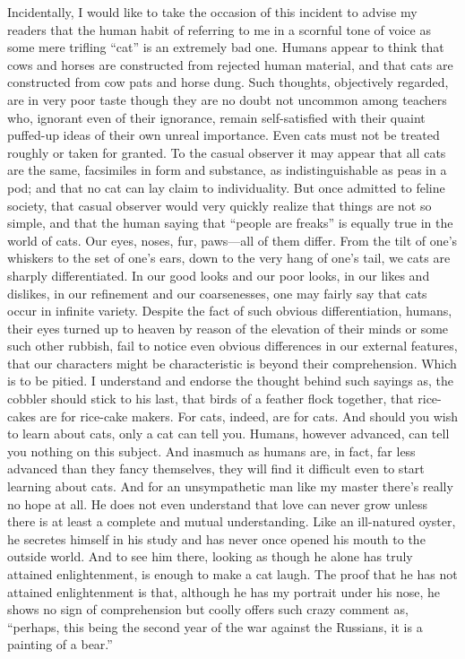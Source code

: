 \documentclass{book}
\begin{document}
Incidentally, I would like to take the occasion of this incident to
advise my readers that the human habit of referring to me in a scornful
tone of voice as some mere trifling ``cat'' is an extremely bad one.
Humans appear to think that cows and horses are constructed from
rejected human material, and that cats are constructed from cow pats and
horse dung. Such thoughts, objectively regarded, are in very poor taste
though they are no doubt not uncommon among teachers who, ignorant even
of their ignorance, remain self-satisfied with their quaint puffed-up
ideas of their own unreal importance. Even cats must not be treated
roughly or taken for granted. To the casual observer it may appear that
all cats are the same, facsimiles in form and substance, as
indistinguishable as peas in a pod; and that no cat can lay claim to
individuality. But once admitted to feline society, that casual observer
would very quickly realize that things are not so simple, and that the
human saying that ``people are freaks'' is equally true in the world of
cats. Our eyes, noses, fur, paws---all of them differ. From the tilt of
one's whiskers to the set of one's ears, down to the very hang of one's
tail, we cats are sharply differentiated. In our good looks and our poor
looks, in our likes and dislikes, in our refinement and our
coarsenesses, one may fairly say that cats occur in infinite variety.
Despite the fact of such obvious differentiation, humans, their eyes
turned up to heaven by reason of the elevation of their minds or some
such other rubbish, fail to notice even obvious differences in our
external features, that our characters might be characteristic is beyond
their comprehension. Which is to be pitied. I understand and endorse the
thought behind such sayings as, the cobbler should stick to his last,
that birds of a feather flock together, that rice-cakes are for
rice-cake makers. For cats, indeed, are for cats. And should you wish to
learn about cats, only a cat can tell you. Humans, however advanced, can
tell you nothing on this subject. And inasmuch as humans are, in fact,
far less advanced than they fancy themselves, they will find it
difficult even to start learning about cats. And for an unsympathetic
man like my master there's really no hope at all. He does not even
understand that love can never grow unless there is at least a complete
and mutual understanding. Like an ill-natured oyster, he secretes
himself in his study and has never once opened his mouth to the outside
world. And to see him there, looking as though he alone has truly
attained enlightenment, is enough to make a cat laugh. The proof that he
has not attained enlightenment is that, although he has my portrait
under his nose, he shows no sign of comprehension but coolly offers such
crazy comment as, ``perhaps, this being the second year of the war
against the Russians, it is a painting of a bear.''
\end{document}
